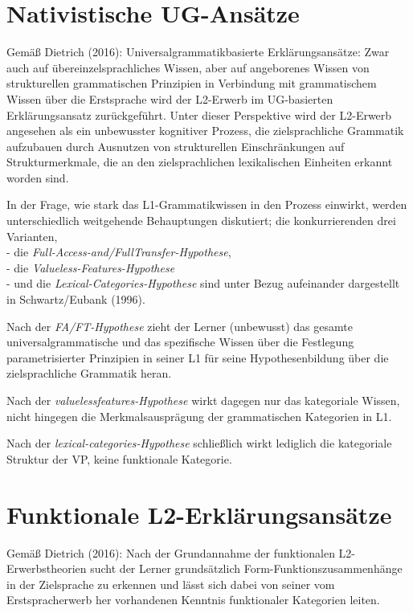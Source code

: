\documentclass[
  letterpaper,
]{scrbook}
\begin{document}
\hypertarget{nativistische-ug-ansuxe4tze}{%
\section{Nativistische UG-Ansätze}\label{nativistische-ug-ansuxe4tze}}

Gemäß Dietrich (2016): Universalgrammatikbasierte Erklärungsansätze:
Zwar auch auf übereinzelsprachliches Wissen, aber auf angeborenes Wissen
von strukturellen grammatischen Prinzipien in Verbindung mit
grammatischem Wissen über die Erstsprache wird der L2-Erwerb im
UG-basierten Erklärungsansatz zurückgeführt. Unter dieser Perspektive
wird der L2-Erwerb angesehen als ein unbewusster kognitiver Prozess, die
zielsprachliche Grammatik aufzubauen durch Ausnutzen von strukturellen
Einschränkungen auf Strukturmerkmale, die an den zielsprachlichen
lexikalischen Einheiten erkannt worden sind.

In der Frage, wie stark das L1-Grammatikwissen in den Prozess einwirkt,
werden unterschiedlich weitgehende Behauptungen diskutiert; die
konkurrierenden drei Varianten,\\
- die \emph{Full-Access-and/FullTransfer-Hypothese},\\
- die \emph{Valueless-Features-Hypothese}\\
- und die \emph{Lexical-Categories-Hypothese} sind unter Bezug
aufeinander dargestellt in Schwartz/Eubank (1996).

Nach der \emph{FA/FT-Hypothese} zieht der Lerner (unbewusst) das gesamte
universalgrammatische und das spezifische Wissen über die Festlegung
parametrisierter Prinzipien in seiner L1 für seine Hypothesenbildung
über die zielsprachliche Grammatik heran.

Nach der \emph{valuelessfeatures-Hypothese} wirkt dagegen nur das
kategoriale Wissen, nicht hingegen die Merkmalsausprägung der
grammatischen Kategorien in L1.

Nach der \emph{lexical-categories-Hypothese} schließlich wirkt lediglich
die kategoriale Struktur der VP, keine funktionale Kategorie.

\hypertarget{funktionale-l2-erkluxe4rungsansuxe4tze}{%
\section{Funktionale
L2-Erklärungsansätze}\label{funktionale-l2-erkluxe4rungsansuxe4tze}}

Gemäß Dietrich (2016): Nach der Grundannahme der funktionalen
L2-Erwerbstheorien sucht der Lerner grundsätzlich
Form-Funktionszusammenhänge in der Zielsprache zu erkennen und lässt
sich dabei von seiner vom Erstspracherwerb her vorhandenen Kenntnis
funktionaler Kategorien leiten.
\end{document}
